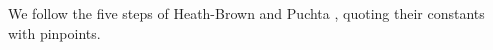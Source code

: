 We follow the five steps of Heath-Brown and Puchta \cite{HBP02}, quoting their constants with pinpoints.
